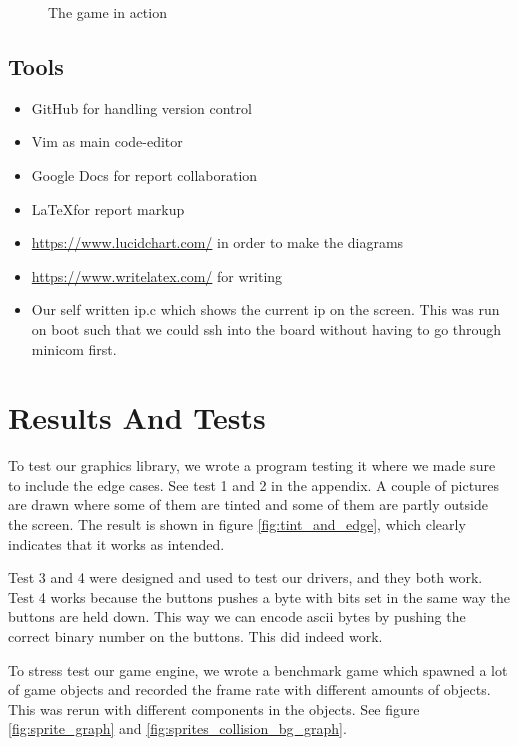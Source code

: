 \documentclass[a4paper,12pt]{article}
\begin{document}
\begin{figure}
\centering
{}
\caption{The game in action}
\label{fig:game}
\end{figure}

\subsection{Tools} %

\begin{itemize}
\item GitHub for handling version control
\item Vim as main code-editor
\item Google Docs for report collaboration
\item \LaTeX for report markup
\item \url{https://www.lucidchart.com/} in order to make the diagrams
\item \url{https://www.writelatex.com/} for writing
\item Our self written ip.c which shows the current ip on the screen. This was run on boot such that we could ssh into the board without having to go through minicom first.
\end{itemize}

\clearpage
\section{Results And Tests}
To test our graphics library, we wrote a program testing it where we made sure to include the edge cases. See test 1 and 2 in the appendix.  A couple of pictures are drawn where some of them are tinted and some of them are partly outside the screen. The result is shown in figure \ref{fig:tint_and_edge}, which clearly indicates that it works as intended. 

Test 3 and 4 were designed and used to test our drivers, and they both work. Test 4 works because the buttons pushes a byte with bits set in the same way the buttons are held down. This way we can encode ascii bytes by pushing the correct binary number on the buttons. This did indeed work.

To stress test our game engine, we wrote a benchmark game which spawned a lot of game objects and recorded the frame rate with different amounts of objects. This was rerun with different components in the objects. See figure \ref{fig:sprite_graph} and \ref{fig:sprites_collision_bg_graph}. 
\end{document}
